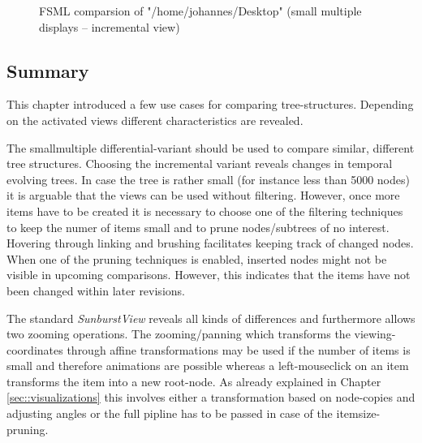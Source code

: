 \begin{figure}[tb]
\caption{\label{fig:fsml-smallmultiples-incremental} FSML comparsion of "/home/johannes/Desktop" (small multiple displays -- incremental view)}
\end{figure}

\subsection{Summary}
This chapter introduced a few use cases for comparing tree-structures. Depending on the activated views different characteristics are revealed. 

The smallmultiple differential-variant should be used to compare similar, different tree structures. Choosing the incremental variant reveals changes in temporal evolving trees. In case the tree is rather small (for instance less than 5000 nodes) it is arguable that the views can be used without filtering. However, once more items have to be created it is necessary to choose one of the filtering techniques to keep the numer of items small and to prune nodes/subtrees of no interest. Hovering through linking and brushing facilitates keeping track of changed nodes. When one of the pruning techniques is enabled, inserted nodes might not be visible in upcoming comparisons. However, this indicates that the items have not been changed within later revisions. 

The standard \emph{SunburstView} reveals all kinds of differences and furthermore allows two zooming operations. The zooming/panning which transforms the viewing-coordinates through affine transformations may be used if the number of items is small and therefore animations are possible whereas a left-mouseclick on an item transforms the item into a new root-node. As already explained in Chapter \ref{sec::visualizations} this involves either a transformation based on node-copies and adjusting angles or the full pipline has to be passed in case of the itemsize-pruning.

